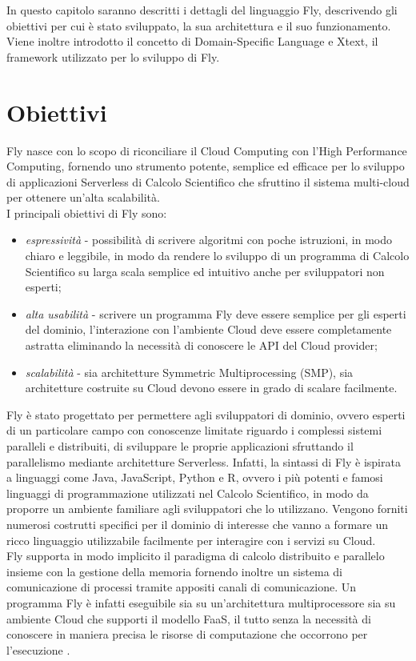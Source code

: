 In questo capitolo saranno descritti i dettagli del linguaggio Fly, descrivendo gli obiettivi per cui è stato sviluppato, la sua architettura e il suo funzionamento. Viene inoltre introdotto il concetto di Domain-Specific Language e Xtext, il framework utilizzato per lo sviluppo di Fly.

\section{Obiettivi}
Fly nasce con lo scopo di riconciliare il Cloud Computing con l’High Performance Computing, fornendo uno strumento potente, semplice ed efficace per lo sviluppo di applicazioni Serverless di Calcolo Scientifico che sfruttino il sistema multi-cloud per ottenere un'alta scalabilità. \\
I principali obiettivi di Fly sono:

\begin{itemize}
    \item \textit{espressività} - possibilità di scrivere algoritmi con poche istruzioni, in modo chiaro e leggibile, in modo da rendere lo sviluppo di un programma di Calcolo Scientifico su larga scala semplice ed intuitivo anche per sviluppatori non esperti;
    
    \item \textit{alta usabilità} - scrivere un programma Fly deve essere semplice per gli esperti del dominio, l’interazione con l’ambiente Cloud deve essere completamente astratta eliminando la necessità di conoscere le API del Cloud provider;
    
    \item \textit{scalabilità} - sia architetture Symmetric Multiprocessing (SMP), sia architetture costruite su Cloud devono essere in grado di scalare facilmente.
\end{itemize}

Fly è stato progettato per permettere agli sviluppatori di dominio, ovvero esperti di un particolare campo con conoscenze limitate riguardo i complessi sistemi paralleli e distribuiti, di sviluppare le proprie applicazioni sfruttando il parallelismo mediante architetture Serverless. Infatti, la sintassi di Fly è ispirata a linguaggi come Java, JavaScript, Python e R, ovvero i più potenti e famosi linguaggi di programmazione utilizzati nel Calcolo Scientifico, in modo da proporre un ambiente familiare agli sviluppatori che lo utilizzano. Vengono forniti numerosi costrutti specifici per il dominio di interesse che vanno a formare un ricco linguaggio utilizzabile facilmente per interagire con i servizi su Cloud. \\
Fly supporta in modo implicito il paradigma di calcolo distribuito e parallelo insieme con la gestione della memoria fornendo inoltre un sistema di comunicazione di processi tramite appositi canali di comunicazione. Un programma Fly è infatti eseguibile sia su un'architettura multiprocessore sia su ambiente Cloud che supporti il modello FaaS, il tutto senza la necessità di conoscere in maniera precisa le risorse di computazione che occorrono per l'esecuzione \cite{ISISLab}.

